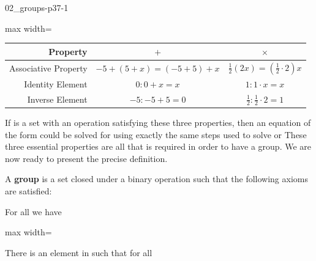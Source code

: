 \documentclass[11pt,oneside]{article}
\begin{document}
\BookNarrativetrue

\begin{BookBody}

\begin{BookFloat}{02_groups-p37-1}
\begin{center}
\begin{adjustbox}{max width=\linewidth}
\renewcommand{\arraystretch}{1.35}\setlength{\tabcolsep}{5pt}
\begin{tabular}{r|c|c}
Property & $+$ & $\times$\\\hline
Associative Property & $-5+(5+x)=(-5+5)+x$ & $\frac12(2x)=\left(\frac12\cdot2\right)x$\\
Identity Element & $0:0+x=x$ & $1:1\cdot x=x$\\
Inverse Element & $-5:-5+5=0$ & $\frac12:\frac12\cdot2=1$
\end{tabular}\end{adjustbox}\end{center}
\end{BookFloat}

If  is a set with an operation \BookInline{\ast } satisfying these three properties, then an equation of the form  could be solved for  using exactly the same steps used to solve  or  These three essential properties are all that is required in order to have a group. We are now ready to present the precise definition.


 A\textbf{ group}  is a set  closed under a binary operation \BookInline{\ast,\allowbreak } such that the following axioms are satisfied:

 For all  we have

\begin{center}\begin{adjustbox}{max width=\linewidth}\end{adjustbox}\end{center}

 There is an element  in  such that for all 


\end{BookBody}
\end{document}
